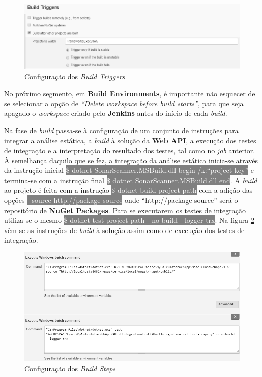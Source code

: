 \begin{figure}[hbt!]
\centering
\includegraphics[width=0.9\linewidth]{Cap5/JenkinsBuildSecondPipelineAutomatically.png}
\caption{Configuração dos \textit{Build Triggers}}
\label{Fig:Fig53}
\end{figure}

\hspace{1cm}No próximo segmento, em \textbf{Build Environments}, é importante não esquecer de se selecionar a opção de \textit{``Delete workspace before build starts''}, para que seja apagado o \textit{workspace} criado pelo \textbf{Jenkins} antes do início de cada \textit{build}.

\hspace{1cm}Na fase de \textit{build} passa-se à configuração de um conjunto de instruções para integrar a análise estática, a \textit{build} à solução da \textbf{Web API}, a execução dos testes de integração e a interpretação do resultado dos testes, tal como no \textit{job} anterior. À semelhança daquilo que se fez, a integração da análise estática inicia-se através da instrução inicial \colorbox{gray}{\textcolor{white}{\$ dotnet SonarScanner.MSBuild.dll begin /k:``project-key''}} e termina-se com a instrução final \colorbox{gray}{\textcolor{white}{\$ dotnet SonarScanner.MSBuild.dll end}}. A \textit{build} ao projeto é feita com a instrução \colorbox{gray}{\textcolor{white}{\$ dotnet build project-path}} com a adição das opções \colorbox{gray}{\textcolor{white}{-{}-source http://package-source}} onde ``http://package-source'' será o repositório de \textbf{NuGet Packages}. Para se executarem os testes de integração utiliza-se o mesmo \colorbox{gray}{\textcolor{white}{\$ dotnet test project-path -{}-no-build -{}-logger trx}}. Na figura \ref{Fig:Fig54} vêm-se as instruções de \textit{build} à solução assim como de execução dos testes de integração.

\begin{figure}[hbt!]
\centering
\includegraphics[width=0.9\linewidth]{Cap5/JenkinsBuildSecondPipelineBuildSteps.png}
\caption{Configuração dos \textit{Build Steps}}
\label{Fig:Fig54}
\end{figure}

